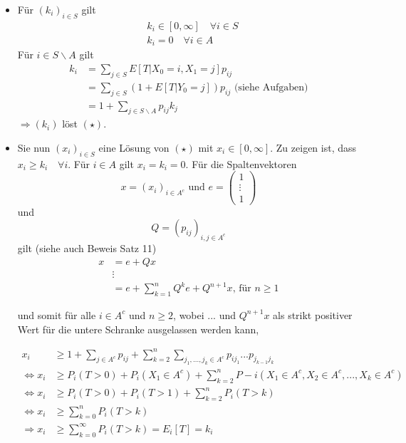 \documentclass[a4paper,12pt]{article}
\begin{document}
\begin{itemize}
	\item Für $(k_i)_{i \in S}$ gilt
	      \begin{align*}
		       & k_i \in [0,\infty] \quad \forall i \in S \\
		       & k_i = 0 \quad \forall i \in A
	      \end{align*}
	      Für $i \in S \backslash A$ gilt
	      \begin{align*}
		      k_i & = \sum_{j \in S}E[T|X_0 = i, X_1 = j]p_{ij}                     \\
		          & = \sum_{j \in S}(1+E[T|Y_0 = j])p_{ij} \text{ (siehe Aufgaben)} \\
		          & = 1 + \sum_{j \in S \backslash A}p_{ij}k_j
	      \end{align*}
	      $\Rightarrow (k_i)$ löst $(\star)$.
	\item Sie nun $(x_i)_{i \in S}$ eine Lösung von $(\star)$ mit $x_i \in [0,\infty]$. Zu zeigen ist, dass $x_i \geq k_i \quad \forall i$.
	      Für $i \in A$ gilt $x_i = k_i = 0$. Für die Spaltenvektoren
	      $$
		      x = (x_i)_{i \in A^c} \text{ und } e = \begin{pmatrix}1 \\  \vdots \\ 1 \end{pmatrix}
	      $$
	      und
	      $$
		      Q = (p_{ij})_{i,j \in A^c}
	      $$
	      gilt (siehe auch Beweis Satz 11)
	      \begin{align*}
		      x & = e + Qx                                                   \\
		        & \vdots                                                     \\
		        & = e + \sum_{k=1}^{n}Q^ke + Q^{n+1}x \text{, für } n \geq 1
	      \end{align*}

	      und somit für alle $i \in A^c$ und $n \geq 2$, wobei ... und
	      $Q^{n+1}x$ als strikt positiver Wert für die untere Schranke ausgelassen werden kann,

	      \begin{align*}
		      x_i                 & \geq 1 + \sum_{j \in A^c}p_{ij} + \sum_{k=2}^{n}\sum_{j_1, ..., j_k \in A^c}p_{ij_1}...p_{j_{k-1}j_k} \\
		      \Leftrightarrow x_i & \geq P_i(T >0) + P_i(X_1 \in A^c) + \sum_{k=2}^{n}P-i(X_1 \in A^c, X_2 \in A^c, ..., X_k \in A^c)     \\
		      \Leftrightarrow x_i & \geq P_i(T>0) + P_i(T>1) + \sum_{k=2}^{n}P_i(T>k)                                                     \\
		      \Leftrightarrow x_i & \geq \sum_{k=0}^{n}P_i(T>k)                                                                           \\
		      \Rightarrow x_i     & \geq \sum_{k=0}^{\infty}P_i(T>k) = E_i[T] = k_i
	      \end{align*}

\end{itemize}
\end{document}
